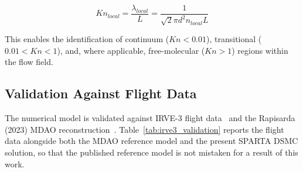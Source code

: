 \begin{equation}
    Kn_{local} = \frac{\lambda_{local}}{L} = \frac{1}{\sqrt{2} \pi d^2 n_{local} L}
\end{equation}

This enables the identification of continuum ($Kn < 0.01$), transitional ($0.01 < Kn < 1$), and, where applicable, free-molecular ($Kn > 1$) regions within the flow field.

\subsection{Validation Against Flight Data}
The numerical model is validated against IRVE-3 flight data~\cite{NASA2013TP4012} and the Rapisarda (2023) MDAO reconstruction~\cite{rapisarda2023mdao}. Table~\ref{tab:irve3_validation} reports the flight data alongside both the MDAO reference model and the present SPARTA DSMC solution, so that the published reference model is not mistaken for a result of this work.

